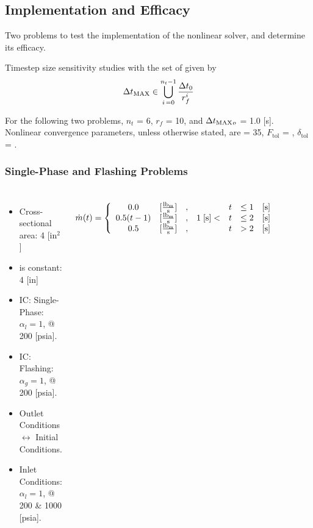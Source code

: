 \documentclass[compress,xcolor=table]{beamer}
\begin{document}
\subsection[Implementation \& Efficacy]{Implementation and Efficacy}
\begin{frame}

Two problems to test the implementation of the nonlinear solver, and determine its efficacy.

Timestep size sensitivity studies with the set of \dtmax{} given by
\begin{equation*}
\dtmax{} \in \bigcup^{n_{t}-1}_{i\, = 0} \frac{\dt{}_{0}}{r^{i}_{f}}
\end{equation*}

For the following two problems, $n_{t}$ = 6, $r_{f}$ = 10, and $\dtmax{}_{o}$ = 1.0 [s]. 
Nonlinear convergence parameters, unless otherwise stated, are \kmax{} = 35, $F_{\text{tol}}$ = , $\delta_{\text{tol}}$ = .

\end{frame}
\begin{frame}
\frametitle{Single-Phase and Flashing Problems}
\begin{columns}

\begin{itemize}
\item{Cross-sectional area: 4 [in$^2$]}
\item{\dx{} is constant: 4 [in]}
\item{IC: Single-Phase: $\alpha_{l} = 1$, @ 200 [psia].}
\item{IC: Flashing: $\alpha_{g}=1$, @ 200 [psia].}
\item{Outlet Conditions $\longleftrightarrow$ Initial Conditions.}
\item{Inlet Conditions: $\alpha_{l}=1$, @ 200 \& 1000 [psia].}
\end{itemize}
\begin{equation*}
\dot{m}(t) = \left\{
\begin{array}{cclrcll}
 0.0           & [\frac{ \lbm{} }{\text{s}}] & , &                & t & \leq 1 & [\text{s}] \\
 0.5 ( t - 1)  & [\frac{ \lbm{} }{\text{s}}] & , & 1\; [\text{s}] < & t & \leq 2 & [\text{s}] \\
 0.5           & [\frac{ \lbm{} }{\text{s}}] & , &                & t & > 2    & [\text{s}]
\end{array}\right.
\end{equation*}

\begin{figure}[h!t]
\centering
\resizebox{\textwidth}{0.6\textheight}{

}

\end{figure}
\end{columns}
\end{frame}
\end{document}
